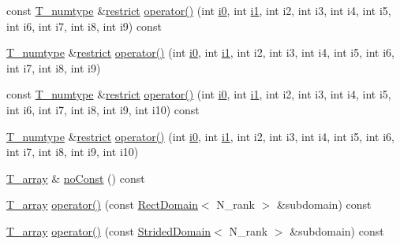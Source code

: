 \begin{DoxyCompactItemize}
\item 
const \hyperlink{classArray_ae72770f4a1d2f8b7193badafc320f008}{T\+\_\+numtype} \&\hyperlink{compiler_8h_a080abdcb9c02438f1cd2bb707af25af8}{restrict} \hyperlink{classArray_a5aa6face3070826707d04865d076f117}{operator()} (int \hyperlink{cephes_8h_aacd2643d920288e61be16787561a4514}{i0}, int \hyperlink{cephes_8h_ab24474d03df1f9adf1700c2c1badd1a5}{i1}, int i2, int i3, int i4, int i5, int i6, int i7, int i8, int i9) const 
\item 
\hyperlink{classArray_ae72770f4a1d2f8b7193badafc320f008}{T\+\_\+numtype} \&\hyperlink{compiler_8h_a080abdcb9c02438f1cd2bb707af25af8}{restrict} \hyperlink{classArray_af55d0cd88bba0b3f518db325484649b8}{operator()} (int \hyperlink{cephes_8h_aacd2643d920288e61be16787561a4514}{i0}, int \hyperlink{cephes_8h_ab24474d03df1f9adf1700c2c1badd1a5}{i1}, int i2, int i3, int i4, int i5, int i6, int i7, int i8, int i9)
\item 
const \hyperlink{classArray_ae72770f4a1d2f8b7193badafc320f008}{T\+\_\+numtype} \&\hyperlink{compiler_8h_a080abdcb9c02438f1cd2bb707af25af8}{restrict} \hyperlink{classArray_ade03e79f6d6f3ae9b82a745f25adb279}{operator()} (int \hyperlink{cephes_8h_aacd2643d920288e61be16787561a4514}{i0}, int \hyperlink{cephes_8h_ab24474d03df1f9adf1700c2c1badd1a5}{i1}, int i2, int i3, int i4, int i5, int i6, int i7, int i8, int i9, int i10) const 
\item 
\hyperlink{classArray_ae72770f4a1d2f8b7193badafc320f008}{T\+\_\+numtype} \&\hyperlink{compiler_8h_a080abdcb9c02438f1cd2bb707af25af8}{restrict} \hyperlink{classArray_ab69d1c914293c899e5220773b61b93cd}{operator()} (int \hyperlink{cephes_8h_aacd2643d920288e61be16787561a4514}{i0}, int \hyperlink{cephes_8h_ab24474d03df1f9adf1700c2c1badd1a5}{i1}, int i2, int i3, int i4, int i5, int i6, int i7, int i8, int i9, int i10)
\item 
\hyperlink{classArray_a6a3d9b6a214107a10df219091801f1e0}{T\+\_\+array} \& \hyperlink{classArray_a90ce3c59fa9b26ea251e092e7ae5f027}{no\+Const} () const 
\item 
\hyperlink{classArray_a6a3d9b6a214107a10df219091801f1e0}{T\+\_\+array} \hyperlink{classArray_aa302def8dcf46382b2680e5ea3e94e13}{operator()} (const \hyperlink{classRectDomain}{Rect\+Domain}$<$ N\+\_\+rank $>$ \&subdomain) const 
\item 
\hyperlink{classArray_a6a3d9b6a214107a10df219091801f1e0}{T\+\_\+array} \hyperlink{classArray_ad089654bfd25b024abc75003f0d747c5}{operator()} (const \hyperlink{classStridedDomain}{Strided\+Domain}$<$ N\+\_\+rank $>$ \&subdomain) const 

\end{DoxyCompactItemize}
